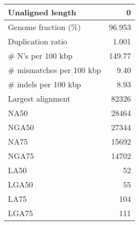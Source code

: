 \documentclass[12pt,a4paper]{article}
\begin{document}
\begin{table}[ht]
\begin{center}
\begin{tabular}{|l*{1}{|r}|}
Unaligned length & 0 \\ \hline
Genome fraction (\%) & 96.953 \\ \hline
Duplication ratio & 1.001 \\ \hline
\# N's per 100 kbp & 149.77 \\ \hline
\# mismatches per 100 kbp & 9.40 \\ \hline
\# indels per 100 kbp & 8.93 \\ \hline
Largest alignment & 82326 \\ \hline
NA50 & 28464 \\ \hline
NGA50 & 27344 \\ \hline
NA75 & 15692 \\ \hline
NGA75 & 14702 \\ \hline
LA50 & 52 \\ \hline
LGA50 & 55 \\ \hline
LA75 & 104 \\ \hline
LGA75 & 111 \\ \hline
\end{tabular}
\end{center}
\end{table}
\end{document}
